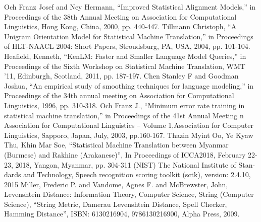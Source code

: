 \documentclass[conference]{IEEEtran}
\begin{document}
\begin{thebibliography}{00}
 Och Franz Josef and Ney Hermann, ``Improved Statistical Alignment Models,'' in Proceedings of the 38th Annual Meeting on Association for Computational Linguistics, Hong Kong, China, 2000, pp. 440-447.
 Tillmann Christoph, ``A Unigram Orientation Model for Statistical Machine Translation,'' in Proceedings of HLT-NAACL 2004: Short Papers, Stroudsburg, PA, USA, 2004, pp. 101-104.
 Heafield, Kenneth, ``KenLM: Faster and Smaller Language Model Queries,'' in Proceedings of the Sixth Workshop on Statistical Machine Translation, WMT ’11, Edinburgh, Scotland, 2011, pp. 187-197.
 Chen Stanley F and Goodman Joshua, ``An empirical study of smoothing techniques for language modeling,'' in Proceedings of the 34th annual meeting on Association for Computational Linguistics, 1996, pp. 310-318.
 Och Franz J., ``Minimum error rate training in statistical machine translation,'' in Proceedings of the 41st Annual Meeting n Association for Computational Linguistics – Volume 1,Association for Computer Linguistics, Sapporo, Japan, July, 2003, pp.160-167.
 Thazin Myint Oo, Ye Kyaw Thu, Khin Mar Soe, ``Statistical Machine Translation between Myanmar (Burmese) and Rakhine (Arakanese)'', In Proceedings of ICCA2018, February 22-23, 2018, Yangon, Myanmar, pp. 304-311
 (NIST) The National Institute of Stan- dards and Technology, Speech recognition scoring toolkit (sctk), version: 2.4.10, 2015
 Miller, Frederic P. and Vandome, Agnes F. and McBrewster, John, Levenshtein Distance: Information Theory, Computer Science, String (Computer Science), ``String Metric, Damerau Levenshtein Distance, Spell Checker, Hamming Distance'', ISBN: 6130216904, 9786130216900, Alpha Press, 2009.

\end{thebibliography}
\end{document}
